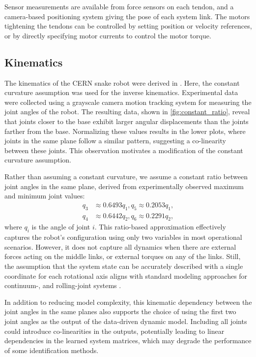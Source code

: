 \documentclass[../main.tex]{subfiles}
\begin{document}
Sensor measurements are available from force sensors on each tendon, and a camera-based positioning system giving the pose of each system link. The motors tightening the tendons can be controlled by setting position or velocity references, or by directly specifying motor currents to control the motor torque.

\subsection{Kinematics}
\label{sec:constant_ratio}

The kinematics of the CERN snake robot were derived in \cite{hansen2025}. Here, the constant curvature assumption \cite{rao2021} was used for the inverse kinematics. Experimental data were collected using a grayscale camera motion tracking system for measuring the joint angles of the robot. The resulting data, shown in \cref{fig:constant_ratio}, reveal that joints closer to the base exhibit larger angular displacements than the joints farther from the base. Normalizing these values results in the lower plots, where joints in the same plane follow a similar pattern, suggesting a co-linearity between these joints. This observation motivates a modification of the constant curvature assumption.

Rather than assuming a constant curvature, we assume a constant ratio between joint angles in the same plane, derived from experimentally observed maximum and minimum joint values:
\begin{equation}
\begin{split}
    q_3 &\approx 0.6493 q_1, q_5 \approx 0.2053 q_1,\\
    q_4 &\approx 0.6442 q_2, q_6 \approx 0.2291 q_2,
\end{split}
\end{equation}
where $q_i$ is the angle of joint $i$. This ratio-based approximation effectively captures the robot's configuration using only two variables in most operational scenarios. However, it does not capture all dynamics when there are external forces acting on the middle links, or external torques on any of the links. Still, the assumption that the system state can be accurately described with a single coordinate for each rotational axis aligns with standard modeling approaches for continuum-, \cite{rao2021} and rolling-joint systems \cite{kim2014}.

In addition to reducing model complexity, this kinematic dependency between the joint angles in the same planes also supports the choice of using the first two joint angles as the output of the data-driven dynamic model. Including all joints could introduce co-linearities in the outputs, potentially leading to linear dependencies in the learned system matrices, which may degrade the performance of some identification methods.
\end{document}
